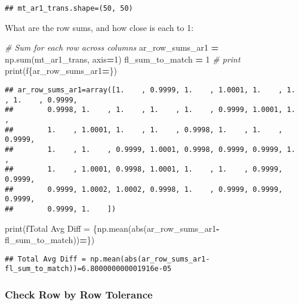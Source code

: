 \documentclass[
]{book}
\newenvironment{Shaded}{\begin{snugshade}}{\end{snugshade}}
\newcommand{\BuiltInTok}[1]{#1}
\newcommand{\CommentTok}[1]{\textcolor[rgb]{0.56,0.35,0.01}{\textit{#1}}}
\newcommand{\DecValTok}[1]{\textcolor[rgb]{0.00,0.00,0.81}{#1}}
\newcommand{\NormalTok}[1]{#1}
\newcommand{\OperatorTok}[1]{\textcolor[rgb]{0.81,0.36,0.00}{\textbf{#1}}}
\newcommand{\SpecialCharTok}[1]{\textcolor[rgb]{0.00,0.00,0.00}{#1}}
\newcommand{\SpecialStringTok}[1]{\textcolor[rgb]{0.31,0.60,0.02}{#1}}
\begin{document}
\begin{verbatim}
## mt_ar1_trans.shape=(50, 50)
\end{verbatim}

What are the row sums, and how close is each to 1:

\begin{Shaded}
\begin{Highlighting}[]
\CommentTok{\# Sum for each row across columns}
\NormalTok{ar\_row\_sums\_ar1 }\OperatorTok{=}\NormalTok{ np.}\BuiltInTok{sum}\NormalTok{(mt\_ar1\_trans, axis}\OperatorTok{=}\DecValTok{1}\NormalTok{)}
\NormalTok{fl\_sum\_to\_match }\OperatorTok{=} \DecValTok{1}
\CommentTok{\# print}
\BuiltInTok{print}\NormalTok{(}\SpecialStringTok{f\textquotesingle{}}\SpecialCharTok{\{}\NormalTok{ar\_row\_sums\_ar1}\OperatorTok{=}\SpecialCharTok{\}}\SpecialStringTok{\textquotesingle{}}\NormalTok{)}
\end{Highlighting}
\end{Shaded}

\begin{verbatim}
## ar_row_sums_ar1=array([1.    , 0.9999, 1.    , 1.0001, 1.    , 1.    , 1.    , 0.9999,
##        0.9998, 1.    , 1.    , 1.    , 1.    , 0.9999, 1.0001, 1.    ,
##        1.    , 1.0001, 1.    , 1.    , 0.9998, 1.    , 1.    , 0.9999,
##        1.    , 1.    , 0.9999, 1.0001, 0.9998, 0.9999, 0.9999, 1.    ,
##        1.    , 1.0001, 0.9998, 1.0001, 1.    , 1.    , 0.9999, 0.9999,
##        0.9999, 1.0002, 1.0002, 0.9998, 1.    , 0.9999, 0.9999, 0.9999,
##        0.9999, 1.    ])
\end{verbatim}

\begin{Shaded}
\begin{Highlighting}[]
\BuiltInTok{print}\NormalTok{(}\SpecialStringTok{f\textquotesingle{}Total Avg Diff = }\SpecialCharTok{\{np.}\NormalTok{mean(}\BuiltInTok{abs}\NormalTok{(ar\_row\_sums\_ar1}\OperatorTok{{-}}\NormalTok{fl\_sum\_to\_match))}\OperatorTok{=}\SpecialCharTok{\}}\SpecialStringTok{\textquotesingle{}}\NormalTok{)}
\end{Highlighting}
\end{Shaded}

\begin{verbatim}
## Total Avg Diff = np.mean(abs(ar_row_sums_ar1-fl_sum_to_match))=6.800000000001916e-05
\end{verbatim}

\hypertarget{check-row-by-row-tolerance}{%
\subsubsection{Check Row by Row Tolerance}\label{check-row-by-row-tolerance}}
\end{document}
